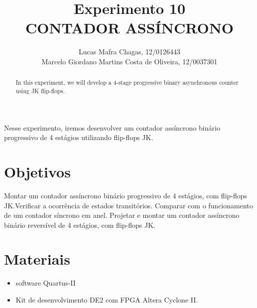 \documentclass[12pt]{article}
\title{Experimento 10\\ 
	CONTADOR ASSÍNCRONO}
\author{
	Lucas Mafra Chagas, 12/0126443 \\
	Marcelo Giordano Martins Costa de Oliveira,  12/0037301
}
\begin{document}
	
	\maketitle
	
	\begin{abstract}
		In this experiment, we will develop a 4-stage progressive binary asynchronous counter using JK flip-flops.
	\end{abstract}
	
	\begin{resumo} 
		Nesse experimento, iremos desenvolver um contador assíncrono binário progressivo de 4 estágios utilizando flip-flops JK.
	
	\end{resumo}
	
	\section{Objetivos}
	\label{sec:Objetivos}
		Montar um contador assíncrono binário progressivo de 4 estágios, com flip-flops
		JK.Verificar a ocorrência de estados transitórios. Comparar com o funcionamento de
		um contador síncrono em anel. Projetar e montar um contador assíncrono binário
		reversível de 4 estágios, com flip-flops JK.
	
	
	\section{Materiais} 
	\label{sec:Materiais}
	
	\begin{itemize}
		\item software Quartus-II
		\item Kit de desenvolvimento DE2 com FPGA Altera Cyclone II.
	\end{itemize}
	
\end{document}
